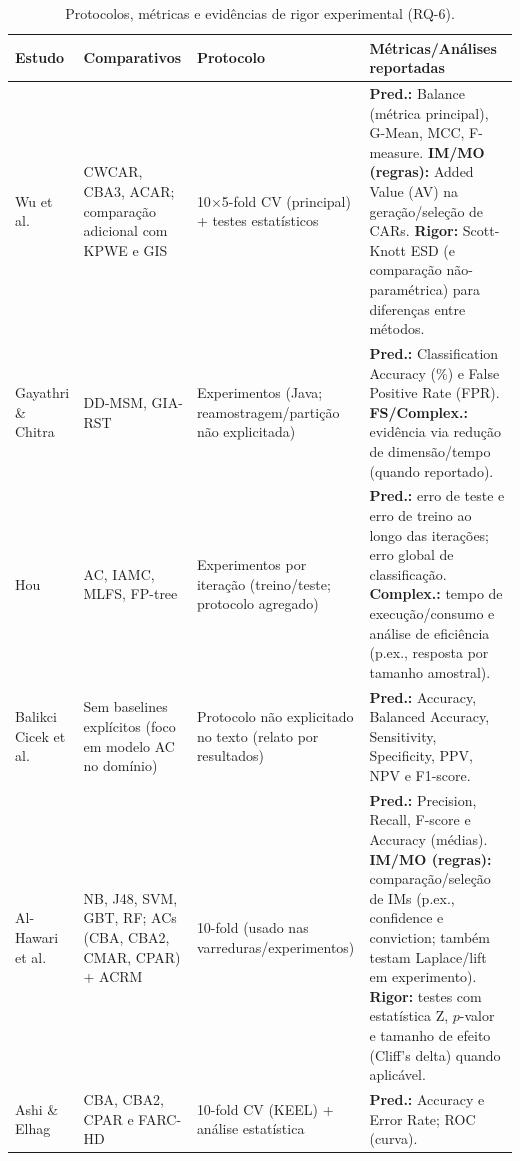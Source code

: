 \begin{table}[H]
\centering
\footnotesize
\setlength{\tabcolsep}{4pt}
\renewcommand{\arraystretch}{1.15}
\caption{Protocolos, métricas e evidências de rigor experimental (RQ-6).}
\label{tab:rq6}
\begin{tabularx}{\textwidth}{|p{3.1cm}|p{3.7cm}|p{2.2cm}|X|}
\hline
\textbf{Estudo} & \textbf{Comparativos} & \textbf{Protocolo} & \textbf{Métricas/Análises reportadas} \\
\hline
Wu et al. \cite{wu2024novel} &
CWCAR, CBA3, ACAR; comparação adicional com KPWE e GIS &
10$\times$5-fold CV (principal) + testes estatísticos &
\textbf{Pred.:} Balance (métrica principal), G-Mean, MCC, F-measure.
\textbf{IM/MO (regras):} Added Value (AV) na geração/seleção de CARs.
\textbf{Rigor:} Scott-Knott ESD (e comparação não-paramétrica) para diferenças entre métodos. \\
\hline
Gayathri \& Chitra \cite{gayathri2015efficient} &
DD-MSM, GIA-RST &
Experimentos (Java; reamostragem/partição não explicitada) &
\textbf{Pred.:} Classification Accuracy (\%) e False Positive Rate (FPR).
\textbf{FS/Complex.:} evidência via redução de dimensão/tempo (quando reportado). \\
\hline
Hou \cite{hou2025improved} &
AC, IAMC, MLFS, FP-tree &
Experimentos por iteração (treino/teste; protocolo agregado) &
\textbf{Pred.:} erro de teste e erro de treino ao longo das iterações; erro global de classificação.
\textbf{Complex.:} tempo de execução/consumo e análise de eficiência (p.ex., resposta por tamanho amostral). \\
\hline
Balikci Cicek et al. \cite{cicek2021assessment} &
Sem baselines explícitos (foco em modelo AC no domínio) &
Protocolo não explicitado no texto (relato por resultados) &
\textbf{Pred.:} Accuracy, Balanced Accuracy, Sensitivity, Specificity, PPV, NPV e F1-score. \\
\hline
Al-Hawari et al. \cite{alhawari2021classification} &
NB, J48, SVM, GBT, RF; ACs (CBA, CBA2, CMAR, CPAR) + ACRM &
10-fold (usado nas varreduras/experimentos) &
\textbf{Pred.:} Precision, Recall, F-score e Accuracy (médias).
\textbf{IM/MO (regras):} comparação/seleção de IMs (p.ex., confidence e conviction; também testam Laplace/lift em experimento).
\textbf{Rigor:} testes com estatística Z, $p$-valor e tamanho de efeito (Cliff’s delta) quando aplicável. \\
\hline
Ashi \& Elhag \cite{ashi2021enhancing} &
CBA, CBA2, CPAR e FARC-HD &
10-fold CV (KEEL) + análise estatística &
\textbf{Pred.:} Accuracy e Error Rate; ROC (curva).

\end{tabularx}
\end{table}
